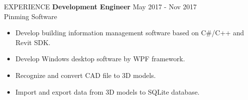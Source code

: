 \documentclass{resume} %
\begin{document}
\begin{rSection}{EXPERIENCE}
\textbf{Development Engineer} \hfill May 2017 - Nov 2017\\
Pinming Software \hfill \textit{}
\begin{itemize}
  \itemsep -3pt {}
  \item Develop building information management software based on C\#/C++ and Revit SDK.
  \item Develop Windows desktop software by WPF framework.
  \item Recognize and convert CAD file to 3D models.
  \item Import and export data from 3D models to SQLite database.
\end{itemize}

\end{rSection}
\end{document}
